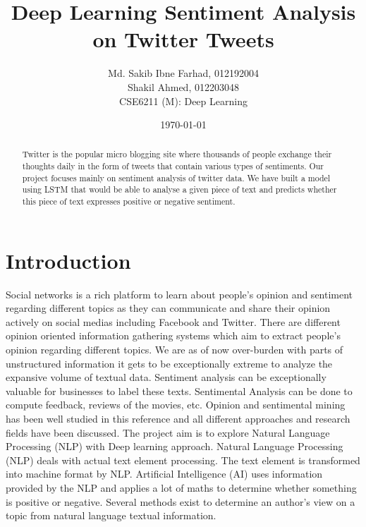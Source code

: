 \documentclass{article}
\title{Deep Learning Sentiment Analysis on Twitter Tweets}
\author{Md. Sakib Ibne Farhad, 012192004 \\
		Shakil Ahmed, 012203048 \\		
		CSE6211 (M): Deep Learning}
\date{\today}
\begin{document}
\maketitle
\begin{abstract}
    Twitter is the popular micro blogging site where thousands of people exchange their thoughts daily in the form of tweets that contain various types of sentiments. Our project focuses mainly on sentiment analysis of twitter data. We have built a model using LSTM that would be able to analyse a given piece of text and predicts whether this piece of text expresses positive or negative sentiment.
\end{abstract}

\section{Introduction} 
Social networks is a rich platform to learn about people’s opinion and sentiment regarding different topics as they can communicate and share their opinion actively on social medias including Facebook and Twitter. There are different opinion oriented information gathering systems which aim to extract people’s opinion regarding different topics. We are as of now over-burden with parts of unstructured information it gets to be exceptionally extreme to analyze the expansive volume of textual data. Sentiment analysis can be exceptionally valuable for businesses to label these texts. Sentimental Analysis can be done to compute feedback, reviews of the movies, etc. Opinion and sentimental mining has been well studied in this reference and all different approaches and research fields have been discussed\cite{liu2012sentiment}. The project aim is to explore Natural Language Processing (NLP) with Deep learning approach. Natural Language Processing (NLP) deals with actual text element processing. The text element is transformed into machine format by NLP. Artificial Intelligence (AI) uses information provided by the NLP and applies a lot of maths to determine whether something is positive or negative. Several methods exist to determine an author’s view on a topic from natural language textual information. 
\end{document}
